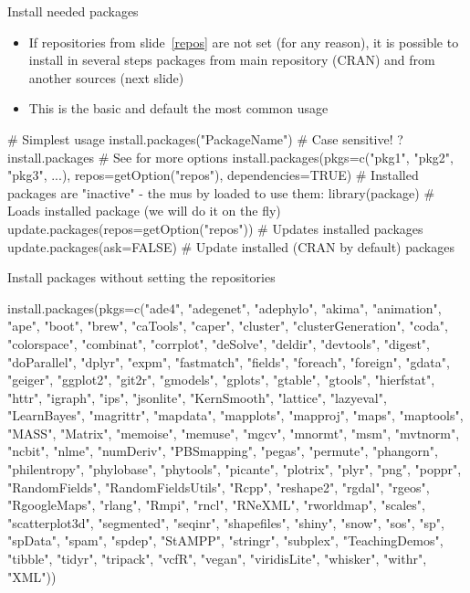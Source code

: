 \documentclass[compress, ucs, xelatex, 11pt, xcolor=svgnames,
  hyperref={
    bookmarks=true,
    unicode=true,
    colorlinks=true,
    pdftitle={Molecular data in R},
    plainpages=false,
    pdfauthor={Vojtech Zeisek},
    pdfsubject={Course about phylogeny and evolution in R},
    pdfcreator={XeLaTeX},
    pdfkeywords={R, evolution, phylogeny, molecular data},
    linkcolor=Tomato,
    anchorcolor=SaddleBrown,
    citecolor=Goldenrod,
    filecolor=DarkMagenta,
    menucolor=Sienna,
    urlcolor=DarkTurquoise,
    pdftex},
  url={hyphens, lowtilde} %
  ]{beamer}
\begin{document}
\begin{frame}[fragile]{Install needed packages}
  \begin{itemize}
   \item If repositories from slide~\ref{repos} are not set (for any reason), it is possible to install in several steps packages from main repository (CRAN) and from another sources (next slide)
   \item This is the basic and default the most common usage
  \end{itemize}
  \begin{spluscode}
    # Simplest usage
    install.packages("PackageName") # Case sensitive!
    ?install.packages # See for more options
    install.packages(pkgs=c("pkg1", "pkg2", "pkg3", ...),
      repos=getOption("repos"), dependencies=TRUE)
    # Installed packages are "inactive" - the mus by loaded to use them:
    library(package) # Loads installed package (we will do it on the fly)
    update.packages(repos=getOption("repos")) # Updates installed packages
    update.packages(ask=FALSE) # Update installed (CRAN by default) packages
  \end{spluscode}
\end{frame}

\begin{frame}[fragile]{Install packages without setting the repositories}
  \begin{spluscode}
    install.packages(pkgs=c("ade4", "adegenet", "adephylo", "akima",
      "animation", "ape", "boot", "brew", "caTools", "caper", "cluster",
      "clusterGeneration", "coda", "colorspace", "combinat", "corrplot",
      "deSolve", "deldir", "devtools", "digest", "doParallel", "dplyr",
      "expm", "fastmatch", "fields", "foreach", "foreign", "gdata",
      "geiger", "ggplot2", "git2r", "gmodels", "gplots", "gtable", "gtools",
      "hierfstat", "httr", "igraph", "ips", "jsonlite", "KernSmooth",
      "lattice", "lazyeval", "LearnBayes", "magrittr", "mapdata",
      "mapplots", "mapproj", "maps", "maptools", "MASS", "Matrix",
      "memoise", "memuse", "mgcv", "mnormt", "msm", "mvtnorm", "ncbit",
      "nlme", "numDeriv", "PBSmapping", "pegas", "permute", "phangorn",
      "philentropy", "phylobase", "phytools", "picante", "plotrix", "plyr",
      "png", "poppr", "RandomFields", "RandomFieldsUtils", "Rcpp",
      "reshape2", "rgdal", "rgeos", "RgoogleMaps", "rlang", "Rmpi", "rncl",
      "RNeXML", "rworldmap", "scales", "scatterplot3d", "segmented",
      "seqinr", "shapefiles", "shiny", "snow", "sos", "sp", "spData",
      "spam", "spdep", "StAMPP", "stringr", "subplex", "TeachingDemos",
      "tibble", "tidyr", "tripack", "vcfR", "vegan", "viridisLite",
      "whisker", "withr", "XML"))
  \end{spluscode}
\end{frame}
\end{document}

